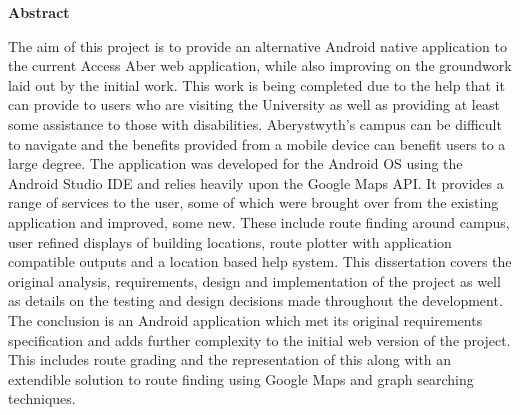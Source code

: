 \thispagestyle{empty}

\begin{center}
    {\LARGE\bf Abstract}
\end{center}

The aim of this project is to provide an alternative Android native application to the current
Access Aber web application, while also improving on the groundwork laid out by the initial
work. This work is being completed due to the help that it can provide to users who are visiting the University as
well as providing at least some assistance to those with disabilities. Aberystwyth's campus can be
difficult to navigate and the benefits provided from a mobile device can benefit users to a large
degree.
The application was developed for the Android OS using the Android Studio IDE and relies
heavily upon the Google Maps API. It provides a range of services to the user, some of which
were brought over from the existing application and improved, some new. These include route
finding around campus, user refined displays of building locations, route plotter with application
compatible outputs and a location based help system.
This dissertation covers the original analysis, requirements, design and implementation of the
project as well as details on the testing and design decisions made throughout the development.
The conclusion is an Android application which met its original requirements specification and
adds further complexity to the initial web version of the project. This includes route grading and
the representation of this along with an extendible solution to route finding using Google Maps
and graph searching techniques.